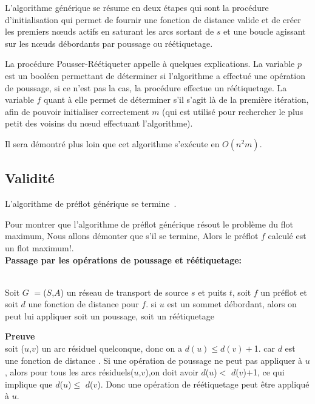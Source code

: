 L'algorithme générique se résume en deux étapes qui sont la procédure d'initialisation qui permet de
fournir une fonction de distance valide et de créer les premiers n\oe uds actifs en saturant les
arcs sortant de $s$ et une boucle agissant sur les n\oe uds débordants par poussage ou réétiquetage.




La procédure Pousser-Réétiqueter appelle à quelques explications. La variable $p$ est un booléen
permettant de déterminer si l'algorithme a effectué une opération de poussage, si ce n'est pas la
cas, la procédure effectue un réétiquetage. La variable $f$ quant à elle permet de déterminer s'il
s'agit là de la première itération, afin de pouvoir initialiser correctement $m$ (qui est utilisé
pour rechercher le plus petit des voisins du n\oe ud effectuant l'algorithme).



Il sera démontré plus loin que cet algorithme s'exécute en $O(n^2m)$.

\subsection{Validité}

\begin{thrm}
	L'algorithme de préflot générique se termine~\cite{introalg}.
\end{thrm}

Pour montrer que l'algorithme de préflot générique résout le problème du flot maximum, Nous allons démonter que s'il se termine, Alors le préflot $f$ calculé est un flot maximum!.\\

\textbf{Passage par les opérations de poussage et réétiquetage:}  
\begin{lemma} ~\\
	\label{increase_distance}Soit $G$ $=$($S$,$A$) un réseau de transport de source $s$ et puits $t$, soit $f$ un préflot et 
  soit $d$ une fonction  de distance  pour $f$. si $u$ est un sommet débordant, alors on peut lui appliquer soit un poussage, soit un réétiquetage  
\end{lemma}   
\textbf{Preuve} \\
soit ($u$,$v$) un arc résiduel quelconque, donc on a $d(u)\leq d(v)+$1. car $d$ est une fonction  de distance .  Si une opération de poussage ne peut pas appliquer à $u$, alors pour tous les arcs résiduels($u$,$v$),on doit avoir $d$($u$)$<$ $d$($v$)$+$1, ce qui implique que $d$($u$)$\leq$ $d$($v$). Donc une opération de réétiquetage peut être appliqué à $u$.\\                        

